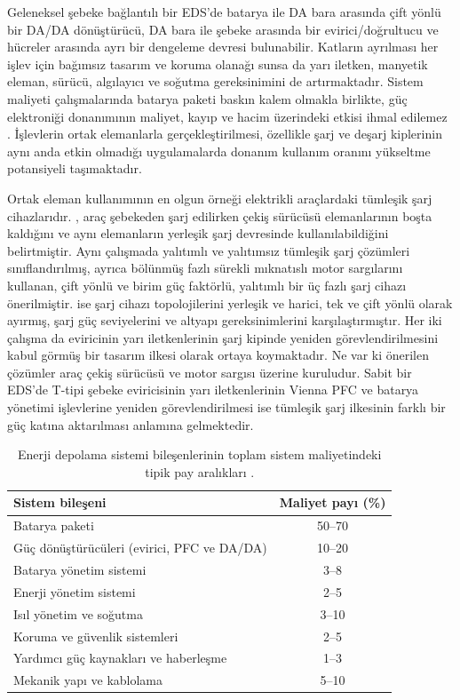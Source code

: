 Geleneksel şebeke bağlantılı bir EDS'de batarya ile DA bara arasında çift yönlü bir DA/DA dönüştürücü, DA bara ile şebeke arasında bir evirici/doğrultucu ve hücreler arasında ayrı bir dengeleme devresi bulunabilir. Katların ayrılması her işlev için bağımsız tasarım ve koruma olanağı sunsa da yarı iletken, manyetik eleman, sürücü, algılayıcı ve soğutma gereksinimini de artırmaktadır. Sistem maliyeti çalışmalarında batarya paketi baskın kalem olmakla birlikte, güç elektroniği donanımının maliyet, kayıp ve hacim üzerindeki etkisi ihmal edilemez \citep{Ramasamy2023,Lazard2024}. İşlevlerin ortak elemanlarla gerçekleştirilmesi, özellikle şarj ve deşarj kiplerinin aynı anda etkin olmadığı uygulamalarda donanım kullanım oranını yükseltme potansiyeli taşımaktadır.

Ortak eleman kullanımının en olgun örneği elektrikli araçlardaki tümleşik şarj cihazlarıdır. \citet{Haghbin2013}, araç şebekeden şarj edilirken çekiş sürücüsü elemanlarının boşta kaldığını ve aynı elemanların yerleşik şarj devresinde kullanılabildiğini belirtmiştir. Aynı çalışmada yalıtımlı ve yalıtımsız tümleşik şarj çözümleri sınıflandırılmış, ayrıca bölünmüş fazlı sürekli mıknatıslı motor sargılarını kullanan, çift yönlü ve birim güç faktörlü, yalıtımlı bir üç fazlı şarj cihazı önerilmiştir. \citet{Yilmaz2013} ise şarj cihazı topolojilerini yerleşik ve harici, tek ve çift yönlü olarak ayırmış, şarj güç seviyelerini ve altyapı gereksinimlerini karşılaştırmıştır. Her iki çalışma da eviricinin yarı iletkenlerinin şarj kipinde yeniden görevlendirilmesini kabul görmüş bir tasarım ilkesi olarak ortaya koymaktadır. Ne var ki önerilen çözümler araç çekiş sürücüsü ve motor sargısı üzerine kuruludur. Sabit bir EDS'de T-tipi şebeke eviricisinin yarı iletkenlerinin Vienna PFC ve batarya yönetimi işlevlerine yeniden görevlendirilmesi ise tümleşik şarj ilkesinin farklı bir güç katına aktarılması anlamına gelmektedir.

\begin{table}[H]
  \centering
  \caption{Enerji depolama sistemi bileşenlerinin toplam sistem maliyetindeki tipik pay aralıkları \citep{Ramasamy2023,Lazard2024}.}
  \label{tab:eds-maliyet-dagilimi}
  \begin{tabular}{>{\raggedright\arraybackslash}p{} c}
    \toprule
    \textbf{Sistem bileşeni} & \textbf{Maliyet payı (\%)} \\
    \midrule
    Batarya paketi & 50--70 \\
    Güç dönüştürücüleri (evirici, PFC ve DA/DA) & 10--20 \\
    Batarya yönetim sistemi & 3--8 \\
    Enerji yönetim sistemi & 2--5 \\
    Isıl yönetim ve soğutma & 3--10 \\
    Koruma ve güvenlik sistemleri & 2--5 \\
    Yardımcı güç kaynakları ve haberleşme & 1--3 \\
    Mekanik yapı ve kablolama & 5--10 \\
    \bottomrule
  \end{tabular}
\end{table}

